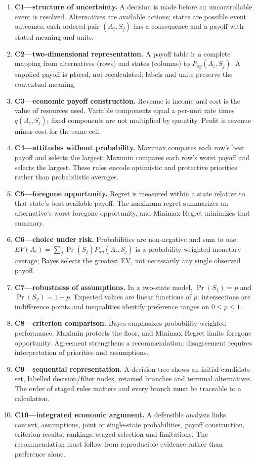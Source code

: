 \documentclass[10pt,letterpaper]{article}
\begin{document}
\begin{enumerate}[leftmargin=2em,itemsep=4pt]
  \item \textbf{C1---structure of uncertainty.} A decision is made before an uncontrollable event is resolved. Alternatives are available actions; states are possible event outcomes; each ordered pair $(A_i,S_j)$ has a consequence and a payoff with stated meaning and units.
  \item \textbf{C2---two-dimensional representation.} A payoff table is a complete mapping from alternatives (rows) and states (columns) to $P_{ay}(A_i,S_j)$. A supplied payoff is placed, not recalculated; labels and units preserve the contextual meaning.
  \item \textbf{C3---economic payoff construction.} Revenue is income and cost is the value of resources used. Variable components equal a per-unit rate times $q(A_i,S_j)$; fixed components are not multiplied by quantity. Profit is revenue minus cost for the same cell.
  \item \textbf{C4---attitudes without probability.} Maximax compares each row's best payoff and selects the largest; Maximin compares each row's worst payoff and selects the largest. These rules encode optimistic and protective priorities rather than probabilistic averages.
  \item \textbf{C5---foregone opportunity.} Regret is measured within a state relative to that state's best available payoff. The maximum regret summarizes an alternative's worst foregone opportunity, and Minimax Regret minimizes that summary.
  \item \textbf{C6---choice under risk.} Probabilities are non-negative and sum to one. $EV(A_i)=\sum_j\Pr(S_j)P_{ay}(A_i,S_j)$ is a probability-weighted monetary average; Bayes selects the greatest EV, not necessarily any single observed payoff.
  \item \textbf{C7---robustness of assumptions.} In a two-state model, $\Pr(S_1)=p$ and $\Pr(S_2)=1-p$. Expected values are linear functions of $p$; intersections are indifference points and inequalities identify preference ranges on $0\leq p\leq1$.
  \item \textbf{C8---criterion comparison.} Bayes emphasizes probability-weighted performance, Maximin protects the floor, and Minimax Regret limits foregone opportunity. Agreement strengthens a recommendation; disagreement requires interpretation of priorities and assumptions.
  \item \textbf{C9---sequential representation.} A decision tree shows an initial candidate set, labelled decision/filter nodes, retained branches and terminal alternatives. The order of staged rules matters and every branch must be traceable to a calculation.
  \item \textbf{C10---integrated economic argument.} A defensible analysis links context, assumptions, joint or single-state probabilities, payoff construction, criterion results, rankings, staged selection and limitations. The recommendation must follow from reproducible evidence rather than preference alone.
\end{enumerate}
\end{document}

